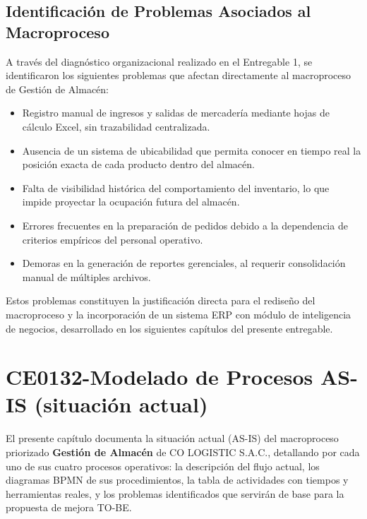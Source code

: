 \documentclass[11pt, a4paper, oneside]{report}
\begin{document}
\newpage
\section{Identificación de Problemas Asociados al Macroproceso}

A través del diagnóstico organizacional realizado en el Entregable 1, se identificaron los siguientes problemas que afectan directamente al macroproceso de Gestión de Almacén:

\begin{itemize}
    \item Registro manual de ingresos y salidas de mercadería mediante hojas de cálculo Excel, sin trazabilidad centralizada.
    \item Ausencia de un sistema de ubicabilidad que permita conocer en tiempo real la posición exacta de cada producto dentro del almacén.
    \item Falta de visibilidad histórica del comportamiento del inventario, lo que impide proyectar la ocupación futura del almacén.
    \item Errores frecuentes en la preparación de pedidos debido a la dependencia de criterios empíricos del personal operativo.
    \item Demoras en la generación de reportes gerenciales, al requerir consolidación manual de múltiples archivos.
\end{itemize}

Estos problemas constituyen la justificación directa para el rediseño del macroproceso y la incorporación de un sistema ERP con módulo de inteligencia de negocios, desarrollado en los siguientes capítulos del presente entregable.




\chapter{CE0132-Modelado de Procesos AS-IS (situación actual)}

El presente capítulo documenta la situación actual (AS-IS) del macroproceso priorizado \textbf{Gestión de Almacén} de CO LOGISTIC S.A.C., detallando por cada uno de sus cuatro procesos operativos: la descripción del flujo actual, los diagramas BPMN de sus procedimientos, la tabla de actividades con tiempos y herramientas reales, y los problemas identificados que servirán de base para la propuesta de mejora TO-BE.
\end{document}
